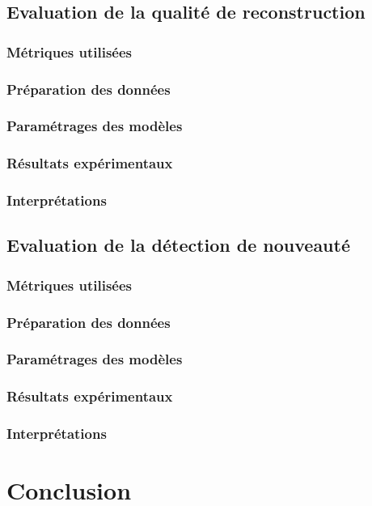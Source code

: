 	\subsection{Evaluation de la qualité de reconstruction}
	\subsubsection{Métriques utilisées}
	\subsubsection{Préparation des données}
	\subsubsection{Paramétrages des modèles}
	\subsubsection{Résultats expérimentaux}
	\subsubsection{Interprétations}
	\subsection{Evaluation de la détection de nouveauté}
	\subsubsection{Métriques utilisées}
	\subsubsection{Préparation des données}
	\subsubsection{Paramétrages des modèles}
	\subsubsection{Résultats expérimentaux}
	\subsubsection{Interprétations}
	\section{Conclusion}
		

